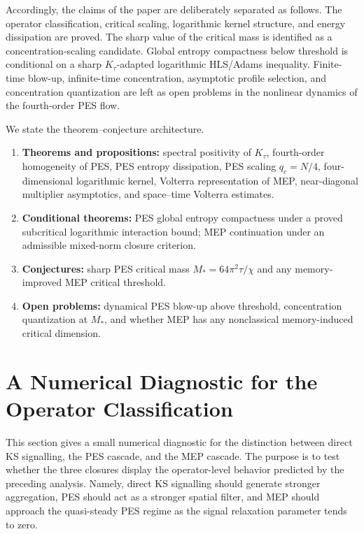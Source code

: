 \documentclass[pdflatex,sn-mathphys-num]{sn-jnl}%
\theoremstyle{thmstyleone}
\theoremstyle{thmstyletwo}
\theoremstyle{thmstylethree}
\begin{document}
Accordingly, the claims of the paper are deliberately separated as follows.
The operator classification, critical scaling, logarithmic kernel structure,
and energy dissipation are proved.  The sharp value of the critical mass is
identified as a concentration-scaling candidate.  Global entropy compactness
below threshold is conditional on a sharp \(K_\tau\)-adapted logarithmic
HLS/Adams inequality.  Finite-time blow-up, infinite-time concentration,
asymptotic profile selection, and concentration quantization are left as open
problems in the nonlinear dynamics of the fourth-order PES flow.

We state the theorem--conjecture architecture.
\begin{enumerate}
    \item \textbf{Theorems and propositions:} spectral positivity of
    \(K_\tau\), fourth-order homogeneity of PES, PES entropy dissipation, PES
    scaling \(q_c=N/4\), four-dimensional logarithmic kernel, Volterra
    representation of MEP, near-diagonal multiplier asymptotics, and
    space--time Volterra estimates.

    \item \textbf{Conditional theorems:} PES global entropy compactness under a
    proved subcritical logarithmic interaction bound; MEP continuation under an
    admissible mixed-norm closure criterion.

    \item \textbf{Conjectures:} sharp PES critical mass \(M_*=64\pi^2\tau/\chi\)
    and any memory-improved MEP critical threshold.

    \item \textbf{Open problems:} dynamical PES blow-up above threshold,
    concentration quantization at \(M_*\), and whether MEP has any
    nonclassical memory-induced critical dimension.
\end{enumerate}

\section{A Numerical Diagnostic for the Operator Classification}
\label{sec:numerical-diagnostic}

This section gives a small numerical diagnostic for the distinction between
direct KS signalling, the PES cascade, and the MEP cascade. 
The purpose is to test whether the three closures display the
operator-level behavior predicted by the preceding analysis. Namely, direct
KS signalling should generate stronger aggregation, PES should act
as a stronger spatial filter, and MEP should approach the quasi-steady PES
regime as the signal relaxation parameter tends to zero.
\end{document}
